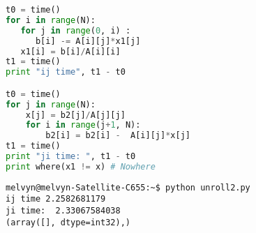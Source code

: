 \documentclass[11pt]{article}
\begin{document}
\begin{enumerate}
\begin{enumerate}
\begin{lstlisting}[language=Python]
t0 = time()
for i in range(N):
   for j in range(0, i) :
      b[i] -= A[i][j]*x1[j]
   x1[i] = b[i]/A[i][i]
t1 = time()
print "ij time", t1 - t0

t0 = time()
for j in range(N):
    x[j] = b2[j]/A[j][j]
    for i in range(j+1, N):
        b2[i] = b2[i] -  A[i][j]*x[j]
t1 = time()
print "ji time: ", t1 - t0 
print where(x1 != x) # Nowhere
\end{lstlisting}

\begin{lstlisting}
melvyn@melvyn-Satellite-C655:~$ python unroll2.py
ij time 2.2582681179
ji time:  2.33067584038
(array([], dtype=int32),)
\end{lstlisting}
\end{enumerate}
\end{enumerate}
\end{document}
